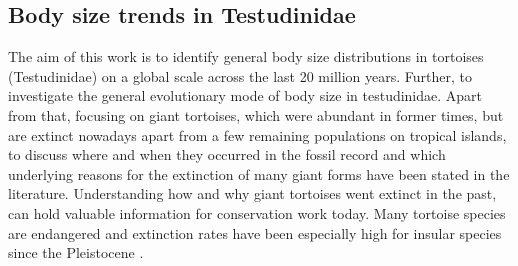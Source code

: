 
 

\subsection{Body size trends in Testudinidae}

The aim of this work is to identify general body size distributions in tortoises (Testudinidae) on a global scale across the last 20 million years. Further, to investigate the general evolutionary mode of body size in testudinidae. 
Apart from that, focusing on giant tortoises, which were abundant in former times, but are extinct nowadays apart from a few remaining populations on tropical islands, to discuss where and when they occurred in the fossil record and which underlying reasons for the extinction of many giant forms have been stated in the literature.
Understanding how and why giant tortoises went extinct in the past, can hold valuable information for conservation work today. Many tortoise species are endangered and extinction rates have been especially high for insular species since the Pleistocene \citep{Rhodin2015}.



